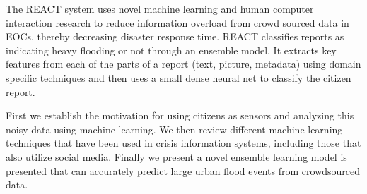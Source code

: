 The REACT system uses novel machine learning and human computer interaction
research to reduce information overload from crowd sourced data in EOCs, thereby
decreasing disaster response time. REACT classifies reports as indicating heavy
flooding or not through an ensemble model. It extracts key features from
each of the parts of a report (text, picture, metadata) using domain specific
techniques and then uses a small dense neural net to classify the citizen
report.

First we establish the motivation for using citizens as sensors and
analyzing this noisy data using machine learning. We then review different
machine learning techniques that have been used in crisis information
systems, including those that also utilize social media.  Finally we present a
novel ensemble learning model is presented that can accurately predict large
urban flood events from crowdsourced data.
